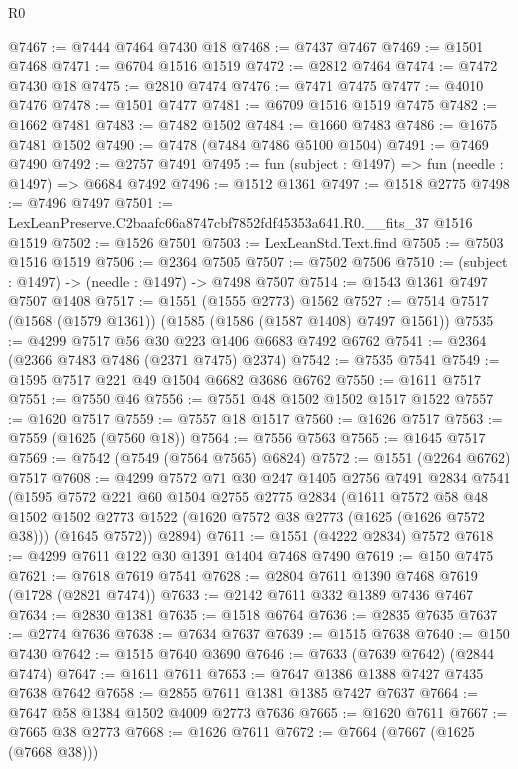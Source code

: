 \begin{lexlean}{R0}
\begin{coremodule}
@7467 := @7444 @7464 @7430 @18
@7468 := @7437 @7467
@7469 := @1501 @7468
@7471 := @6704 @1516 @1519
@7472 := @2812 @7464
@7474 := @7472 @7430 @18
@7475 := @2810 @7474
@7476 := @7471 @7475
@7477 := @4010 @7476
@7478 := @1501 @7477
@7481 := @6709 @1516 @1519 @7475
@7482 := @1662 @7481
@7483 := @7482 @1502
@7484 := @1660 @7483
@7486 := @1675 @7481 @1502
@7490 := @7478 (@7484 @7486 @5100 @1504)
@7491 := @7469 @7490
@7492 := @2757 @7491
@7495 := fun (subject : @1497) => fun (needle : @1497) => @6684 @7492
@7496 := @1512 @1361
@7497 := @1518 @2775
@7498 := @7496 @7497
@7501 := LexLeanPreserve.C2baafc66a8747cbf7852fdf45353a641.R0.__fits_37 @1516 @1519
@7502 := @1526 @7501
@7503 := LexLeanStd.Text.find
@7505 := @7503 @1516 @1519
@7506 := @2364 @7505
@7507 := @7502 @7506
@7510 := (subject : @1497) -> (needle : @1497) -> @7498 @7507
@7514 := @1543 @1361 @7497 @7507 @1408
@7517 := @1551 (@1555 @2773) @1562
@7527 := @7514 @7517 (@1568 (@1579 @1361)) (@1585 (@1586 (@1587 @1408) @7497 @1561))
@7535 := @4299 @7517 @56 @30 @223 @1406 @6683 @7492 @6762
@7541 := @2364 (@2366 @7483 @7486 (@2371 @7475) @2374)
@7542 := @7535 @7541
@7549 := @1595 @7517 @221 @49 @1504 @6682 @3686 @6762
@7550 := @1611 @7517
@7551 := @7550 @46
@7556 := @7551 @48 @1502 @1502 @1517 @1522
@7557 := @1620 @7517
@7559 := @7557 @18 @1517
@7560 := @1626 @7517
@7563 := @7559 (@1625 (@7560 @18))
@7564 := @7556 @7563
@7565 := @1645 @7517
@7569 := @7542 (@7549 (@7564 @7565) @6824)
@7572 := @1551 (@2264 @6762) @7517
@7608 := @4299
    @7572
    @71
    @30
    @247
    @1405
    @2756
    @7491
    @2834
    @7541
    (@1595
      @7572
      @221
      @60
      @1504
      @2755
      @2775
      @2834
      (@1611
        @7572
        @58
        @48
        @1502
        @1502
        @2773
        @1522
        (@1620 @7572 @38 @2773 (@1625 (@1626 @7572 @38)))
        (@1645 @7572))
      @2894)
@7611 := @1551 (@4222 @2834) @7572
@7618 := @4299 @7611 @122 @30 @1391 @1404 @7468 @7490
@7619 := @150 @7475
@7621 := @7618 @7619 @7541
@7628 := @2804 @7611 @1390 @7468 @7619 (@1728 (@2821 @7474))
@7633 := @2142 @7611 @332 @1389 @7436 @7467
@7634 := @2830 @1381
@7635 := @1518 @6764
@7636 := @2835 @7635
@7637 := @2774 @7636
@7638 := @7634 @7637
@7639 := @1515 @7638
@7640 := @150 @7430
@7642 := @1515 @7640 @3690
@7646 := @7633 (@7639 @7642) (@2844 @7474)
@7647 := @1611 @7611
@7653 := @7647 @1386 @1388 @7427 @7435 @7638 @7642
@7658 := @2855 @7611 @1381 @1385 @7427 @7637
@7664 := @7647 @58 @1384 @1502 @4009 @2773 @7636
@7665 := @1620 @7611
@7667 := @7665 @38 @2773
@7668 := @1626 @7611
@7672 := @7664 (@7667 (@1625 (@7668 @38)))

\end{coremodule}
\end{lexlean}
